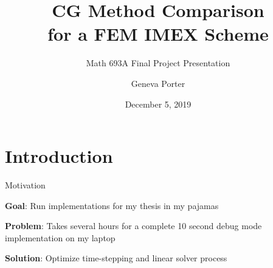 \documentclass{beamer}
\title{CG Method Comparison \\ for a FEM IMEX Scheme}
\subtitle{Math 693A Final Project Presentation}
\author{Geneva Porter}
\institute{San Diego State University\\ Applied Mathematics}
\date{December 5, 2019}
\begin{document}
\AtBeginSection{}

    \begin{frame}
        \maketitle
    \end{frame}
    
    \section[Intro]{Introduction}
    
        \begin{frame}{Motivation}
        
            \vfill
            
            \textbf{Goal}: Run implementations for my thesis in my pajamas
            \vfill
            
            \textbf{Problem}: Takes several hours for a complete 10 second debug mode implementation on my laptop
            \vfill
            
            \textbf{Solution}: Optimize time-stepping and linear solver process
            \vfill
        \end{frame}
    
\end{document}
